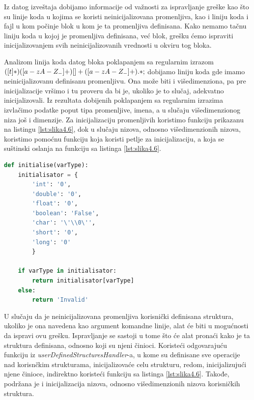 \documentclass[12pt,oneside]{memoir}
\theoremstyle{plain}
\theoremstyle{definition}
\begin{document}
Iz datog izveštaja dobijamo informacije od važnosti za ispravljanje greške kao što su linije koda u kojima se koristi neinicijalizovana promenljiva, kao i liniju koda i fajl u kom počinje blok u kom je ta promenljiva definisana. Kako nemamo tačnu liniju koda u kojoj je promenljiva definisana, već blok, grešku ćemo ispraviti inicijalizovanjem svih neinicijalizovanih vrednosti u okviru tog bloka. 

Analizom linija koda datog bloka poklapanjem sa regularnim izrazom $ ([ \\t]*)([a-zA-Z_-]+)[ ]+([a-zA-Z_-]+).*; $ dobijamo liniju koda gde imamo neinicijalizovanu definisanu promenljivu. Ona može biti i višedimenziona, pa pre inicijalizacije vršimo i tu proveru da bi je, ukoliko je to slučaj, adekvatno inicijalizovali. Iz rezultata dobijenih poklapanjem sa regularnim izrazima izvlačimo podatke poput tipa promenljive, imena, a u slučaju višedimenzionog niza još i dimenzije. Za inicijalizaciju promenljivih koristimo funkciju prikazanu na listingu \ref{lst:slika4.6}, dok u slučaju nizova, odnosno višedimenzionih nizova, koristimo pomoćnu funkciju koja koristi petlje za inicijalizaciju, a koja se suštinski oslanja na funkciju sa listinga \ref{lst:slika4.6}.

\begin{lstlisting}[caption={Funkcija inicijalizacije}, label={lst:slika4.6},language={Python}] 
def initialise(varType):
	initialisator = {
		'int': '0',
		'double': '0',
		'float': '0',
		'boolean': 'False',
		'char': '\'\\0\'',
		'short': '0',
		'long': '0'
	    }
	
	if varType in initialisator:
		return initialisator[varType]
	else:
		return 'Invalid'
\end{lstlisting}


U slučaju da je neinicijalizovana promenljiva korisnički definisana struktura, ukoliko je ona navedena kao argument komandne linije, alat će biti u mogućnosti da ispravi ovu grešku. Ispravljanje se sastoji u tome što će alat pronaći kako je ta struktura definisana, odnosno koji su njeni činioci. Koristeći odgovarajuću funkciju iz \textit{userDefinedStructuresHandler}-a, u kome su definisane sve operacije nad korisnčkim strukturama, inicijalizovaće celu strukturu, redom, inicijalizujući njene činioce, indirektno koristeći funkciju sa listinga \ref{lst:slika4.6}. Takođe, podržana je i inicijalizacija nizova, odnosno višedimenzionih nizova korisničkih struktura. 
\end{document}
